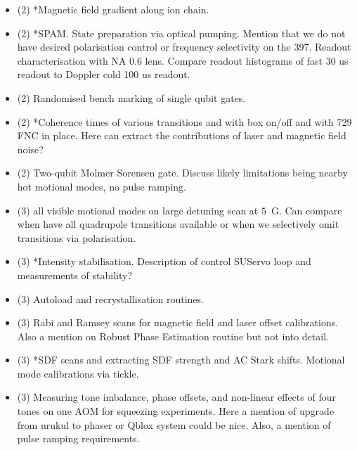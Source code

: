 \documentclass{report}
\begin{document}
\begin{itemize}
    \item (2) *Magnetic field gradient along ion chain.
    \item (2) *SPAM. State preparation via optical pumping. Mention that we do not have desired polarisation control or frequency selectivity on the 397. Readout characterisation with NA 0.6 lens. Compare readout histograms of fast 30 us readout to Doppler cold 100 us readout.
    \item (2) Randomised bench marking of single qubit gates.
    \item (2) *Coherence times of various transitions and with box on/off and with 729 FNC in place. Here can extract the contributions of laser and magnetic field noise?
    \item (2) Two-qubit Molmer Sorensen gate. Discuss likely limitations being nearby hot motional modes, no pulse ramping.
    \item (3) all visible motional modes on large detuning scan at $5$~G. Can compare when have all quadrupole transitions available or when we selectively omit transitions via polarisation.
    \item (3) *Intensity stabilisation. Description of control SUServo loop and measurements of stability?
    \item (3) Autoload and recrystallisation routines.
    \item (3) Rabi and Ramsey scans for magnetic field and laser offset calibrations. Also a mention on Robust Phase Estimation routine but not into detail.
    \item (3) *SDF scans and extracting SDF strength and AC Stark shifts. Motional mode calibrations via tickle.
    \item (3) Measuring tone imbalance, phase offsets, and non-linear effects of four tones on one AOM for squeezing experiments. Here a mention of upgrade from urukul to phaser or Qblox system could be nice. Also, a mention of pulse ramping requirements.
\end{itemize}
\end{document}
